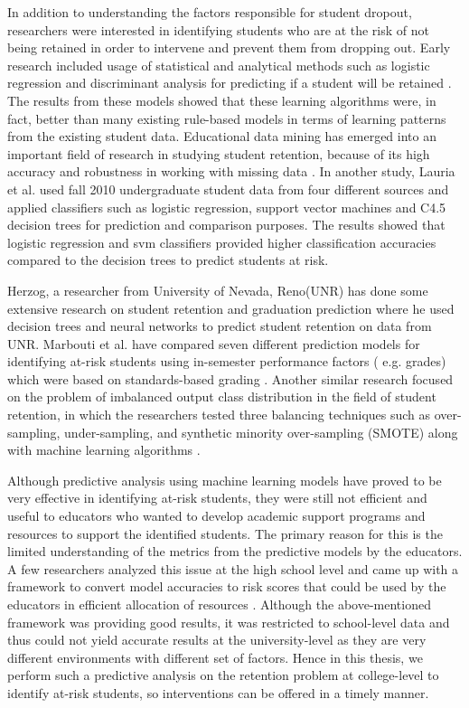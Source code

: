 \documentclass[11pt,openright]{report}
\begin{document}
In addition to understanding the factors responsible for student dropout, researchers were interested in identifying students who are at the risk of not being retained in order to intervene and prevent them from dropping out. Early research included usage of statistical and analytical methods such as logistic regression and discriminant analysis for predicting if a student will be retained \cite{lakkaraju2015machine,marbouti2016models,adejo2017}. The results from these models showed that these learning algorithms were, in fact, better than many existing rule-based models in terms of learning patterns from the existing student data. Educational data mining has emerged into an important field of research in studying student retention, because of its high accuracy and robustness in working with missing data \cite{alkhasawneh2014developing}. In another study, Lauria et al. used fall 2010 undergraduate student data from four different sources and applied classifiers such as logistic regression, support vector machines and C4.5 decision trees for prediction and comparison purposes\cite{lauria2012mining}. The results showed that logistic regression and svm classifiers provided higher classification accuracies compared to the decision trees to predict students at risk. 

Herzog, a researcher from University of Nevada, Reno(UNR) has done some extensive research on student retention and graduation prediction where he used decision trees and neural networks to predict student retention on data from UNR\cite{herzog2006estimating}. Marbouti et al. have compared seven different prediction models for identifying at-risk students using in-semester performance factors ( e.g. grades) which were based on standards-based grading \cite{marbouti2016models} . Another similar research focused on the problem of imbalanced output class distribution in the field of student retention, in which the researchers tested three balancing techniques such as over-sampling, under-sampling, and synthetic minority over-sampling (SMOTE) along with machine learning algorithms \cite{thammasiri2014critical}.

Although predictive analysis using machine learning models have proved to be very effective in identifying at-risk students, they were still not efficient and useful to educators who wanted to develop academic support programs and resources to support the identified students. The primary reason for this is the limited understanding of the metrics from the predictive models by the educators. A few researchers analyzed this issue at the high school level and came up with a framework to convert model accuracies to risk scores that could be used by the educators in efficient allocation of resources \cite{lakkaraju2015machine}. Although the above-mentioned framework was providing good results, it was restricted to school-level data and thus could not yield accurate results at the university-level as they are very different environments with different set of factors. Hence in this thesis, we perform such a predictive analysis on the retention problem at college-level  to identify at-risk students, so interventions can be offered in a timely manner.
\end{document}
